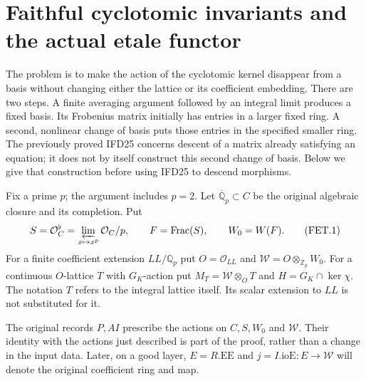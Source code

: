 \section{Faithful cyclotomic invariants and the actual etale functor}
\label{sec:faithful-etale-v057}


The problem is to make the action of the cyclotomic kernel disappear
from a basis without changing either the lattice or its coefficient
embedding. There are two steps. A finite averaging argument followed by
an integral limit produces a fixed basis. Its Frobenius matrix initially
has entries in a larger fixed ring. A second, nonlinear change of basis
puts those entries in the specified smaller ring. The previously proved
IFD25 concerns descent of a matrix already satisfying an equation; it
does not by itself construct this second change of basis. Below we give
that construction before using IFD25 to descend morphisms.

Fix a prime $p$; the argument includes $p=2$. Let
$\overline{\mathbb Q}_p\subset C$ be the original algebraic closure
and its completion. Put
\[
 S=\mathcal O_C^\flat=\varprojlim_{x\mapsto x^p}\mathcal O_C/p,
 \qquad F=\operatorname{Frac}(S),\qquad W_0=W(F).
                                                        \tag{FET.1}
\]
For a finite coefficient extension $LL/\mathbb Q_p$ put
$O=\mathcal O_{LL}$ and $\mathcal W=O\otimes_{\mathbb Z_p}W_0$.
For a continuous $O$-lattice $T$ with $G_K$-action put
$M_T=\mathcal W\otimes_O T$ and $H=G_K\cap\ker\chi$.
The notation $T$ refers to the integral lattice itself. Its scalar
extension to $LL$ is not substituted for it.

The original records $P,AI$ prescribe the actions on $C,S,W_0$ and
$\mathcal W$. Their identity with the actions just described is part of
the proof, rather than a change in the input data. Later, on a good
layer, $E=R.\mathrm{EE}$ and $j=I.\mathrm{ioE}:E\to\mathcal W$
will denote the original coefficient ring and map.

